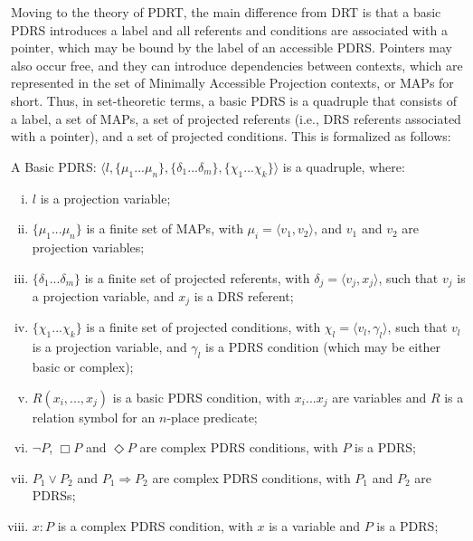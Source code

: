 Moving to the theory of PDRT, the main difference from DRT is that a basic
PDRS introduces a label and all referents and conditions are associated with
a pointer, which may be bound by the label of an accessible PDRS. Pointers
may also occur free, and they can introduce dependencies between contexts,
which are represented in the set of Minimally Accessible Projection
contexts, or MAPs for short. Thus, in set-theoretic terms, a basic PDRS is
a quadruple that consists of a label, a set of MAPs, a set of projected
referents (i.e., DRS referents associated with a pointer), and a set of
projected conditions. This is formalized as follows:

\begin{definition} \label{def:bPDRS}
A Basic PDRS: $\langle l, \{\mu_1 ... \mu_n\}, 
\{\delta_1 ... \delta_m\}, \{\chi_1 ... \chi_k\}\rangle$ is a quadruple, where:
  \begin{enumerate}[i.]
    \item $l$ is a projection variable;
    \item $\{\mu_1 ... \mu_n\}$ is a finite set of MAPs, with $\mu_i=\langle
      v_1,v_2\rangle$, and  $v_1$ and $v_2$ are projection variables;
    \item $\{\delta_1 ... \delta_m\}$ is a finite set of projected
      referents, with $\delta_j=\langle v_j, x_j\rangle$, such that $v_j$ is
      a projection variable, and $x_j$ is a DRS referent;
    \item $\{\chi_1 ... \chi_k\}$ is a finite set of projected conditions,
      with $\chi_l = \langle v_l,\gamma_l\rangle$, such that $v_l$ is a
      projection variable, and $\gamma_l$ is a PDRS condition (which may be
      either basic or complex);
    \item \label{def:bPDRS:Rel} $R(x_i, ..., x_j)$ is a basic PDRS condition,
      with $x_i ... x_j$ are variables and $R$ is a relation symbol for an
      $n$-place predicate;
    \item $\neg P$, $\Box P$ and $\Diamond P$ are complex PDRS conditions,
      with $P$ is a PDRS;
    \item $P_1 \vee P_2$ and $P_1 \Rightarrow P_2$ are complex PDRS
      conditions, with $P_1$ and $P_2$ are PDRSs;
    \item\label{def:bPDRS:Prop} $x:P$ is a complex PDRS condition, with $x$
      is a variable and $P$ is a PDRS;
  \end{enumerate}
\end{definition}

